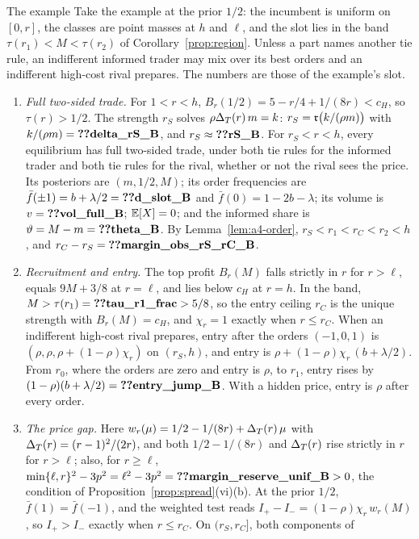 \begin{named}{The example}
Take the example at the prior \(1/2\): the incumbent is uniform on \([0,r]\), the classes are point masses at \(h\)
and \(\ell\), and the slot lies in the band \(\tau(r_1)<M<\tau(r_2)\) of Corollary~\ref{prop:region}. Unless a part
names another tie rule, an indifferent informed trader may mix over its best orders and an indifferent high-cost rival
prepares. The numbers are those of the example's slot.
\begin{enumerate}[label=(\alph*),leftmargin=2em]
\item \emph{Full two-sided trade.} For \(1<r<h\), \(B_r(1/2)=5-r/4+1/(8r)<c_H\), so \(\tau(r)>1/2\). The strength
\(r_S\) solves \(\rho\Delta_T(r)\,m=k\): \(r_S=\mathfrak{r}\bigl(k/(\rho m)\bigr)\) with \(k/(\rho m)=\reg{delta_rS_B}\), and
\(r_S\approx\reg{rS_B}\). For \(r_S<r<h\), every equilibrium has full two-sided trade, under both tie rules for the informed trader and
both tie rules for the rival, whether or not the rival sees the price. Its posteriors are \((m,1/2,M)\); its order
frequencies are \(\bar f(\pm1)=b+\lambda/2=\reg{d_slot_B}\) and \(\bar f(0)=1-2b-\lambda\); its volume is
\(v=\reg{vol_full_B}\); \(\mathbb{E}[X]=0\); and the informed share is \(\vartheta=M-m=\reg{theta_B}\). By
Lemma~\ref{lem:a4-order}, \(r_S<r_1<r_C<r_2<h\), and \(r_C-r_S=\reg{margin_obs_rS_rC_B}\).
\item \emph{Recruitment and entry.} The top profit \(B_r(M)\) falls strictly in \(r\) for \(r>\ell\), equals
\(9M+3/8\) at \(r=\ell\), and lies below \(c_H\) at \(r=h\). In the band, \(M>\tau(r_1)=\reg{tau_r1_frac}>5/8\), so
the entry ceiling \(r_C\) is the unique strength with \(B_r(M)=c_H\), and \(\chi_r=1\) exactly when \(r\le r_C\).
When an indifferent high-cost rival prepares, entry after the orders \((-1,0,1)\) is
\((\rho,\rho,\rho+(1-\rho)\chi_r)\) on \((r_S,h)\), and entry is \(\rho+(1-\rho)\chi_r\,(b+\lambda/2)\). From \(r_0\),
where the orders are zero and entry is \(\rho\), to \(r_1\), entry rises by \((1-\rho)(b+\lambda/2)=\reg{entry_jump_B}\).
With a hidden price, entry is \(\rho\) after every order.
\item \emph{The price gap.} Here \(w_r(\mu)=1/2-1/(8r)+\Delta_T(r)\,\mu\) with \(\Delta_T(r)=(r-1)^2/(2r)\), and both
\(1/2-1/(8r)\) and \(\Delta_T(r)\) rise strictly in \(r\) for \(r>\ell\); also, for \(r\ge\ell\),
\(\min\{\ell,r\}^2-3p^2=\ell^2-3p^2=\reg{margin_reserve_unif_B}>0\), the condition of
Proposition~\ref{prop:spread}(vi)(b). At the prior \(1/2\), \(\bar f(1)=\bar f(-1)\), and the weighted test reads
\(I_+-I_-=(1-\rho)\chi_r\,w_r(M)\), so \(I_+>I_-\) exactly when \(r\le r_C\). On \((r_S,r_C]\), both components of

\end{enumerate}
\end{named}
